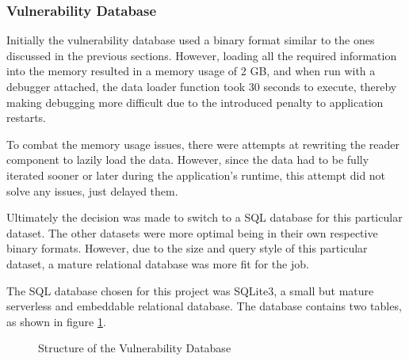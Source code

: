 \documentclass[a4paper,12pt]{article}
\begin{document}
\subsubsection{Vulnerability Database} \label{datcve}
 

	Initially the vulnerability database used a binary format similar to the ones discussed in the previous sections. However, loading all the required information into the memory resulted in a memory usage of 2 GB, and when run with a debugger attached, the data loader function took 30 seconds to execute, thereby making debugging more difficult due to the introduced penalty to application restarts.
	
	To combat the memory usage issues, there were attempts at rewriting the reader component to lazily load the data. However, since the data had to be fully iterated sooner or later during the application's runtime, this attempt did not solve any issues, just delayed them.
	
	Ultimately the decision was made to switch to a SQL database for this particular dataset. The other datasets were more optimal being in their own respective binary formats. However, due to the size and query style of this particular dataset, a mature relational database was more fit for the job.
	
	The SQL database chosen for this project was SQLite3\cite{hipp07}, a small but mature serverless and embeddable relational database. The database contains two tables, as shown in figure \ref{dbstruct}.

	\begin{figure}[H]
		\centering
		\caption{Structure of the Vulnerability Database}
		\label{dbstruct}
	\end{figure}
	
\end{document}
